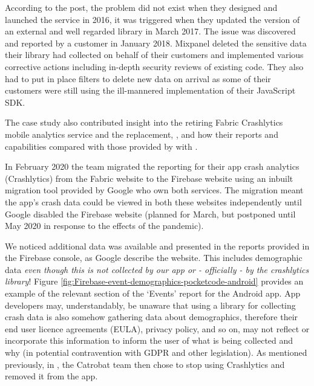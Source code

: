 According to the post, the problem did not exist when they designed and launched the service in 2016, it was triggered when they updated the version of an external and well regarded library in March 2017. The issue was discovered and reported by a customer in January 2018. Mixpanel deleted the sensitive data their library had collected on behalf of their customers and implemented various corrective actions including in-depth security reviews of existing code. They also had to put in place filters to delete new data on arrival as some of their customers were still using the ill-mannered implementation of their JavaScript SDK. %

The  case study also contributed insight into the retiring Fabric Crashlytics mobile analytics service and the replacement, , and how their reports and capabilities compared with those provided by  with .

In February 2020 the  team migrated the reporting for their app crash analytics (Crashlytics) from the Fabric website to the Firebase website using an inbuilt migration tool provided by Google who own both services. The migration meant the app's crash data could be viewed in both these websites independently until Google disabled the Firebase website (planned for March, but postponed until  May 2020 in response to the effects of the  pandemic). 

We noticed additional data was available and presented in the reports provided in the Firebase console, as Google describe the website. This includes demographic data \emph{even though this is not collected by our app or - officially - by the crashlytics library}! Figure \ref{fig:Firebase-event-demographics-pocketcode-android} provides an example of the relevant section of the `Events' report for the  Android app. App developers may, understandably, be unaware that using a library for collecting crash data is also somehow gathering data about demographics, therefore their end user licence agreements (EULA), privacy policy, and so on, may not reflect or incorporate this information to inform the user of what is being collected and why (in potential contravention with GDPR and other legislation). As mentioned previously, in , the Catrobat team then chose to stop using Crashlytics and removed it from the  app.

